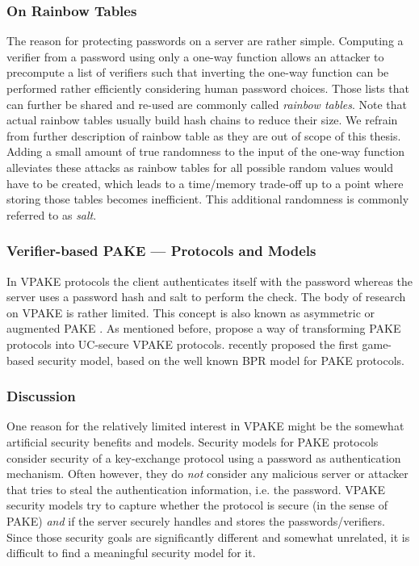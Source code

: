 \subsubsection{On Rainbow Tables}
The reason for protecting passwords on a server are rather simple.
Computing a verifier from a password using only a one-way function allows an attacker to precompute a list of verifiers such that inverting the one-way function can be performed rather efficiently considering human password choices.
Those lists that can further be shared and re-used are commonly called \emph{rainbow tables}.
Note that actual rainbow tables usually build hash chains to reduce their size.
We refrain from further description of rainbow table as they are out of scope of this thesis.
Adding a small amount of true randomness to the input of the one-way function alleviates these attacks as rainbow tables for all possible random values would have to be created, which leads to a time/memory trade-off up to a point where storing those tables becomes inefficient.
This additional randomness is commonly referred to as \emph{salt}.

\subsubsection{Verifier-based PAKE --- Protocols and Models}
In \ac{VPAKE} protocols the client authenticates itself with the password whereas the server uses a password hash and salt to perform the check.
The body of research on \ac{VPAKE} is rather limited.
This concept is also known as asymmetric \cite{Bellare2000} or augmented \ac{PAKE} \cite{BellovinM93}.
As mentioned before, \citet{Gentry2006} propose a way of transforming \ac{PAKE} protocols into \ac{UC}-secure \ac{VPAKE} protocols.
\citet{BenhamoudaP13} recently proposed the first game-based security model, based on the well known BPR model for \ac{PAKE} protocols.

\subsubsection{Discussion}\label{sec:intro:vpake-discusion}
One reason for the relatively limited interest in \acl{VPAKE} might be the somewhat artificial security benefits and models.
Security models for \ac{PAKE} protocols consider security of a key-exchange protocol using a password as authentication mechanism.
Often however, they do \emph{not} consider any malicious server or attacker that tries to steal the authentication information, i.e. the password.
\ac{VPAKE} security models try to capture whether the protocol is secure (in the sense of \acl{PAKE}) \emph{and} if the server securely handles and stores the passwords/verifiers.
Since those security goals are significantly different and somewhat unrelated, it is difficult to find a meaningful security model for it.

